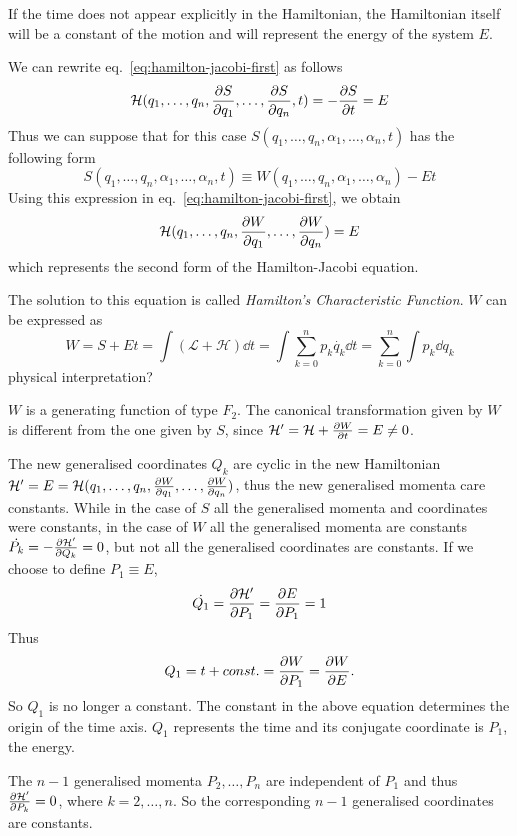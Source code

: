 \documentclass[../thesis.tex]{subfiles}
\theoremstyle{plain}
\begin{document}
If the time does not appear explicitly in the Hamiltonian, the Hamiltonian itself
will be a constant of the motion and will represent the energy of the system \(E\).

We can rewrite eq.~\eqref{eq:hamilton-jacobi-first} as follows
\[
  \mathcal{H}(q_1,\dotsc,q_n,\pdv{S}{q_1},\dotsc,\pdv{S}{q_n},t) = - \pdv{S}{t} = E
\]
Thus we can suppose that for this case \(S(q_1,\dotsc,q_n,\alpha_1,\dotsc,\alpha_n,t)\)
has the following form
\[
  S(q_1,\dotsc,q_n,\alpha_1,\dotsc,\alpha_n,t) \equiv W(q_1,\dotsc,q_n,\alpha_1,\dotsc,\alpha_n) - Et
\]
Using this expression in eq.~\eqref{eq:hamilton-jacobi-first}, we obtain
\begin{equation}
  \label{eq:hamilton-jacobi-second}
  \mathcal{H}(q_1,\dotsc,q_n,\pdv{W}{q_1},\dotsc,\pdv{W}{q_n}) = E
\end{equation}
which represents the second form of the Hamilton-Jacobi equation.

The solution to this equation is called \emph{Hamilton's Characteristic Function}.
\(W\) can be expressed as
\[
  W = S + Et = \int \left(\mathcal{L} + \mathcal{H} \right) \dd{t}
    = \int \sum_{k=0}^n p_k \dot{q_k} \dd{t}
    = \sum_{k=0}^n \int p_k \dd{q_k}
\]
{\color{red}physical interpretation?}

\(W\) is a generating function of type \(F_2\). The canonical transformation given by \(W\)
is different from the one given by \(S\), since
\(\mathcal{H'} = \mathcal{H} + \pdv{W}{t} = E \neq 0\).

The new generalised coordinates \(Q_k\) are cyclic in the new Hamiltonian
\(\mathcal{H'} = E = \mathcal{H}(q_1,\dotsc,q_n,\pdv{W}{q_1},\dotsc,\pdv{W}{q_n})\),
thus the new generalised momenta care constants. While in the case of \(S\)
all the generalised momenta and coordinates were constants, in the case of \(W\)
all the generalised momenta are constants \(\dot{P_k}=-\pdv{\mathcal{H'}}{Q_k}=0\),
but not all the generalised coordinates are constants.
If we choose to define \(P_1 \equiv E\),
\[
  \dot{Q_1} = \pdv{\mathcal{H'}}{P_1} = \pdv{E}{P_1} = 1
\]
Thus
\[
  Q_1 = t + const. = \pdv{W}{P_1} = \pdv{W}{E}.
\]
So \(Q_1\) is no longer a constant. The constant in the above equation determines the
origin of the time axis. \(Q_1\) represents the time and its conjugate coordinate is
\(P_1\), the energy.

The \(n-1\) generalised momenta \(P_2,\dotsc,P_n\) are independent of \(P_1\)
and thus \(\pdv{\mathcal{H'}}{P_k} = 0\), where \(k=2,\dotsc,n\). So the corresponding
\(n-1\) generalised coordinates are constants.
\end{document}
